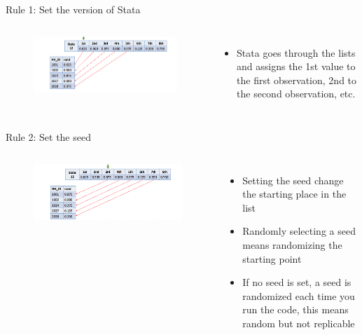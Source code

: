 \documentclass[aspectratio=169]{beamer}
\begin{document}
\begin{frame}{Rule 1: Set the version of Stata}
\begin{columns}[c]
	\begin{figure}
		\centering
		\includegraphics[width=\linewidth]{img/rule1}
	\end{figure}
	\begin{itemize}
		\item Stata goes through the lists and assigns the 1st value to the first observation, 2nd to the second observation, etc.
	\end{itemize}
\end{columns}
\end{frame}


\begin{frame}{Rule 2: Set the seed}
\begin{columns}[c]
\begin{figure}
	\centering
	\includegraphics[width=\linewidth]{img/rule2}
\end{figure}
\begin{itemize}
	\item \small Setting the seed change the starting place in the list
	\item \small Randomly selecting a seed means randomizing the starting point
	\item \small If no seed is set, a seed is randomized each time you run the code, this means random but not replicable
\end{itemize}
\end{columns}
\end{frame}
\end{document}
